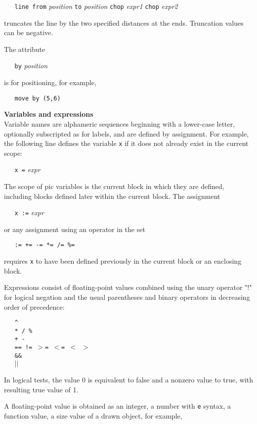 {\tt \ \ \ line\ from}
{\it position}
{\tt to}
{\it position}
{\tt chop}
{\it expr1}
{\tt chop}
{\it expr2}

truncates the line by the two specified distances at the ends.
Truncation values can be negative.

The attribute

{\tt \ \ \ by}
{\it position}

is for positioning, for example,

{\tt \ \ \ move\ by\ (5,6)}
\par\hskip-2pc{\bf Variables and expressions}\\
Variable names are alphameric sequences beginning with a lower-case
letter, optionally subscripted as for labels, and are defined by
assignment.
For example, the following line defines the variable
{\tt x}
if it does not already exist in the current scope:

{\tt \ \ \ x\ =}
{\it expr}

The scope of
pic
variables is the current block in which they are defined, including blocks
defined later within the current block.
The assignment

{\tt \ \ \ x\ :=}
{\it expr}

or any assignment using an operator in the set

{\tt \ \ \ :=\ +=\ -=\ *=\ /=\ \%=}

requires
{\tt x}
to have been defined previously in the current block or an enclosing block.

Expressions consist of floating-point values combined using the unary
operator "!" for logical negation and the usual parentheses and binary
operators in decreasing order of precedence:

{\tt \ \ \ \^{}}
\\\hbox{}\hskip-1pt
{\tt \ \ \ *\ /\ \%}
\\\hbox{}\hskip-1pt
{\tt \ \ \ +\ -}
\\\hbox{}\hskip-1pt
{\tt \ \ \ ==\ !=\ $>$=\ $<$=\ $<$\ $>$}
\\\hbox{}\hskip-1pt
{\tt \ \ \ \&\&}
\\\hbox{}\hskip-1pt
{\tt \ \ \ $|$$|$}

In logical tests, the value 0 is equivalent to false and a nonzero value
to true, with resulting true value of 1.

A floating-point value is obtained as
an integer, a number with
{\tt e}
syntax, a function value, a size value of a drawn object, for example,


